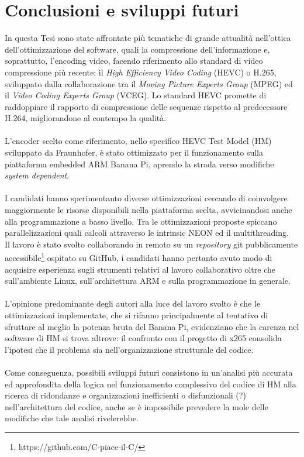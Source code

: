 
\chapter{Conclusioni e sviluppi futuri} %
In questa Tesi sono state affrontate più tematiche di grande attualità  
nell'ottica dell'ottimizzazione del software, quali la compressione 
dell'informazione e, soprattutto, l'encoding video, facendo riferimento allo 
standard di 
video 
compressione più recente: il 
\emph{High Efficiency Video Coding} (HEVC) o H.265, sviluppato dalla 
collaborazione tra il \emph{Moving Picture Experts Group} (MPEG) ed il 
\emph{Video Coding Experts Group} (VCEG). Lo standard HEVC promette di 
raddoppiare il 
rapporto di compressione delle sequenze rispetto al predecessore H.264, 
migliorandone al contempo la qualità.\\ \\
L'encoder scelto come riferimento, nello specifico HEVC Test 
Model (HM) sviluppato da Fraunhofer, è stato ottimizzato per il 
funzionamento sulla piattaforma embedded ARM Banana Pi, aprendo la strada verso 
modifiche \emph{system dependent}.\\ \\
I candidati hanno sperimentanto diverse ottimizzazioni cercando di coinvolgere 
maggiormente le risorse disponibili nella piattaforma scelta, avvicinandosi 
anche alla programmazione a basso livello. Tra le ottimizzazioni proposte 
spiccano 
parallelizzazioni 
quali calcoli attraverso le intrinsic NEON ed il multithreading. \\
Il lavoro è stato svolto collaborando in remoto su un \emph{repository} 
git pubblicamente accessibile\footnote{https://github.com/C-piace-il-C/} 
ospitato su GitHub, i candidati 
hanno pertanto avuto modo di acquisire esperienza sugli strumenti relativi al 
lavoro collaborativo oltre che sull'ambiente Linux, sull'architettura ARM e 
sulla programmazione in generale.\\ \\
L'opinione predominante degli autori alla luce del lavoro svolto è che le 
ottimizzazioni implementate, che si rifanno principalmente al tentativo di 
sfruttare al meglio la potenza bruta del Banana Pi, evidenziano che la carenza 
nel software di HM si trova altrove: il confronto con il progetto di x265 
consolida l'ipotesi che il problema sia nell'organizzazione strutturale del 
codice.\\ \\
Come conseguenza, possibili sviluppi futuri consistono in un'analisi più 
accurata ed approfondita della logica nel funzionamento complessivo del 
codice di HM alla ricerca di ridondanze e organizzazioni inefficienti o  
disfunzionali (?) nell'architettura del codice, anche se è impossibile 
prevedere la mole delle modifiche che tale analisi rivelerebbe.
\label{Chapter8} %

